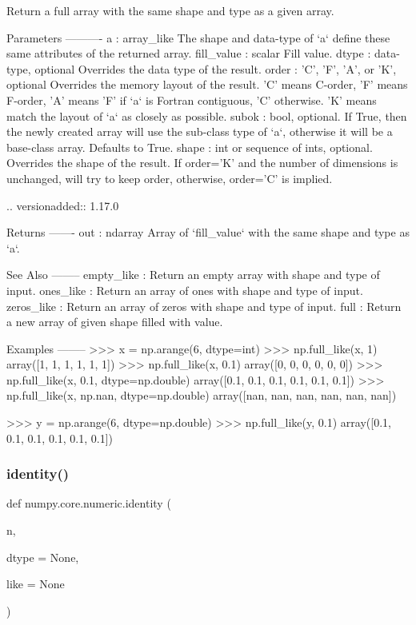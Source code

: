 \begin{DoxyVerb}Return a full array with the same shape and type as a given array.

Parameters
----------
a : array_like
    The shape and data-type of `a` define these same attributes of
    the returned array.
fill_value : scalar
    Fill value.
dtype : data-type, optional
    Overrides the data type of the result.
order : {'C', 'F', 'A', or 'K'}, optional
    Overrides the memory layout of the result. 'C' means C-order,
    'F' means F-order, 'A' means 'F' if `a` is Fortran contiguous,
    'C' otherwise. 'K' means match the layout of `a` as closely
    as possible.
subok : bool, optional.
    If True, then the newly created array will use the sub-class
    type of `a`, otherwise it will be a base-class array. Defaults
    to True.
shape : int or sequence of ints, optional.
    Overrides the shape of the result. If order='K' and the number of
    dimensions is unchanged, will try to keep order, otherwise,
    order='C' is implied.

    .. versionadded:: 1.17.0

Returns
-------
out : ndarray
    Array of `fill_value` with the same shape and type as `a`.

See Also
--------
empty_like : Return an empty array with shape and type of input.
ones_like : Return an array of ones with shape and type of input.
zeros_like : Return an array of zeros with shape and type of input.
full : Return a new array of given shape filled with value.

Examples
--------
>>> x = np.arange(6, dtype=int)
>>> np.full_like(x, 1)
array([1, 1, 1, 1, 1, 1])
>>> np.full_like(x, 0.1)
array([0, 0, 0, 0, 0, 0])
>>> np.full_like(x, 0.1, dtype=np.double)
array([0.1, 0.1, 0.1, 0.1, 0.1, 0.1])
>>> np.full_like(x, np.nan, dtype=np.double)
array([nan, nan, nan, nan, nan, nan])

>>> y = np.arange(6, dtype=np.double)
>>> np.full_like(y, 0.1)
array([0.1, 0.1, 0.1, 0.1, 0.1, 0.1])\end{DoxyVerb}
 \mbox{\label{namespacenumpy_1_1core_1_1numeric_a30ce08a6d993ca8e40d80e55ae83cd19}} 
\subsubsection{\texorpdfstring{identity()}{identity()}}
{\footnotesize\ttfamily def numpy.\+core.\+numeric.\+identity (\begin{DoxyParamCaption}\item[{}]{n,  }\item[{}]{dtype = {\ttfamily None},  }\item[{}]{like = {\ttfamily None} }\end{DoxyParamCaption})}

